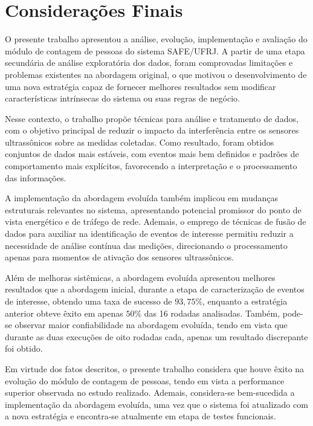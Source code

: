 \section{Considerações Finais}
\label{sec:consideracoes}

O presente trabalho apresentou a análise, evolução, implementação e avaliação do módulo de contagem de pessoas do sistema SAFE/UFRJ. A partir de uma etapa secundária de análise exploratória dos dados, foram comprovadas limitações e problemas existentes na abordagem original, o que motivou o desenvolvimento de uma nova estratégia capaz de fornecer melhores resultados sem modificar características intrínsecas do sistema ou suas regras de negócio.

Nesse contexto, o trabalho propõe técnicas para análise e tratamento de dados, com o objetivo principal de reduzir o impacto da interferência entre os sensores ultrassônicos sobre as medidas coletadas. Como resultado, foram obtidos conjuntos de dados mais estáveis, com eventos mais bem definidos e padrões de comportamento mais explícitos, favorecendo a interpretação e o processamento das informações.

A implementação da abordagem evoluída também implicou em mudanças estruturais relevantes no sistema, apresentando potencial promissor do ponto de vista energético e de tráfego de rede. Ademais, o emprego de técnicas de fusão de dados para auxiliar na identificação de eventos de interesse permitiu reduzir a necessidade de análise contínua das medições, direcionando o processamento apenas para momentos de ativação dos sensores ultrassônicos. 


Além de melhoras sistêmicas, a abordagem evoluída apresentou melhores resultados que a abordagem inicial, durante a etapa de caracterização de eventos de interesse, obtendo uma taxa de sucesso de $93{,}75\%$, enquanto a estratégia anterior obteve êxito em apenas $50\%$ das 16 rodadas analisadas. Também, pode-se observar maior confiabilidade  na abordagem evoluída, tendo em vista que durante as duas execuções de oito rodadas cada, apenas um resultado discrepante foi obtido.

Em virtude dos fatos descritos, o presente trabalho considera que houve êxito na evolução do módulo de contagem de pessoas, tendo em vista a performance superior observada no estudo realizado. Ademais, considera-se bem-sucedida a implementação da abordagem evoluída, uma vez que o sistema foi atualizado com a nova estratégia e encontra-se atualmente em etapa de testes funcionais.

